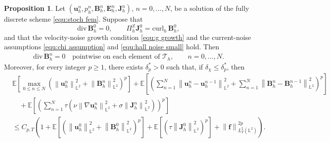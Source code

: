 \documentclass[11pt, reqno]{amsart}
\theoremstyle{definition}
\newtheorem{proposition}[theorem]{Proposition}
\numberwithin{equation}{section}
\newcommand{\divg}{\mathrm{div}\,}
\newcommand{\bff}{\boldsymbol}
\newcommand{\bb}{\mathbb}
\newcommand{\norm}[2]{\left\|{#1}\right\|_{#2}}
\newcommand{\curlh}{\mathrm{curl}_h\,}
\begin{document}
\begin{proposition}
	\label{prop:stoch stability revised}
	Let $(\bff{u}_h^n,p_h^n,\bff{B}_h^n,\bff{E}_h^n,\bff{J}_h^n)$, $n=0,\ldots,N$, be a solution of the fully discrete scheme \eqref{equ:stoch fem}. Suppose that
	\[
	\divg\bff{B}_h^0=0,
	\qquad
	\Pi_h^{\bb{X}} \bff{J}_h^0=\curlh\bff{B}_h^0,
	\]
	and that the velocity-noise growth condition \eqref{equ:g growth} and the current-noise assumptions \eqref{equ:chi assumption} and \eqref{equ:hall noise small} hold.
	Then
	\begin{align}\label{equ:div B exact revised}
		\divg\bff{B}_h^n=0
		\quad\text{pointwise on each element of }\mathcal T_h,
		\qquad n=0,\ldots,N.
	\end{align}
	Moreover, for every integer $p\ge1$, there exists
	$\delta_{p}^\ast>0$ such that, if
	$\delta_\chi\le \delta_{p}^\ast$, then
	\begin{align}\label{equ:stoch stability revised main}
		&\bb E \left[\max_{0\le n\le N}
		\left(
		\norm{\bff u_h^n}{\bb L^2}^2
		+
		\norm{\bff B_h^n}{\bb L^2}^2
		\right)^p\right]
		+
		\bb E\left[
		\left(
		\sum_{n=1}^{N}
		\norm{\bff u_h^n-\bff u_h^{n-1}}{\bb L^2}^2
		+
		\sum_{n=1}^{N}
		\norm{\bff B_h^n-\bff B_h^{n-1}}{\bb L^2}^2
		\right)^p
		\right]
		\nonumber\\
		&\quad
		+
		\bb E\left[
		\left(
		\sum_{n=1}^{N}\tau
		\left(
		\nu\norm{\nabla\bff u_h^n}{\bb L^2}^2
		+
		\sigma\norm{\bff J_h^n}{\bb L^2}^2
		\right)
		\right)^p
		\right]
		\nonumber\\
		&\le
		C_{p,T}
		\left(
		1
		+
		\bb E\left[
		\left(
		\norm{\bff u_h^0}{\bb L^2}^2
		+
		\norm{\bff B_h^0}{\bb L^2}^2
		\right)^p
		\right]
		+
		\bb E\left[
		\left(
		\tau\norm{\bff J_h^0}{\bb L^2}^2
		\right)^p
		\right]
		+
		\norm{\bff f}{L^2_T(\bb L^2)}^{2p}
		\right).
	\end{align}
\end{proposition}
\end{document}
